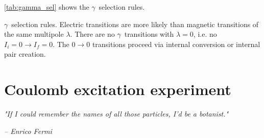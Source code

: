 \documentclass[twoside,english]{uiofysmaster/uiofysmaster}
\newcommand{\ga}{$\gamma$}
\let\orgautoref\autoref
\renewcommand{\autoref}
        {%
		 \def\sectionautorefname{Section}%
		 \def\subsectionautorefname{Section}%
		 \def\subsubsectionautorefname{Section}%
		 \def\chapterautorefname{Chapter}%
          \orgautoref}
\begin{document}
\autoref{tab:gamma_sel} shows the \ga\ selection rules.

\begin{table}[htb] 
    \centering 
    \caption{\ga\ selection rules. Electric transitions are more likely than magnetic transitions of the same multipole $\lambda$. There are no \ga\ transitions with $\lambda = 0$, i.e. no $I_i = 0 \rightarrow I_f = 0$. The $0 \rightarrow 0$ transitions proceed via internal conversion or internal pair creation.}
	
	\label{tab:gamma_sel}
\end{table}







\chapter{Coulomb excitation experiment}
\epigraph{\textit{"If I could remember the names of all those particles, I'd be a botanist."}}{\textit{– Enrico Fermi}}
\end{document}
